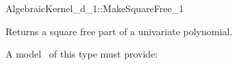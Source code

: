 \begin{ccRefConcept}{AlgebraicKernel_d_1::MakeSquareFree_1}

\ccDefinition
Returns a square free part of a univariate polynomial.
 
\ccRefines 
{}  

\ccOperations
{}

A model \ccVar\ of this type must provide:

{}


\end{ccRefConcept}
